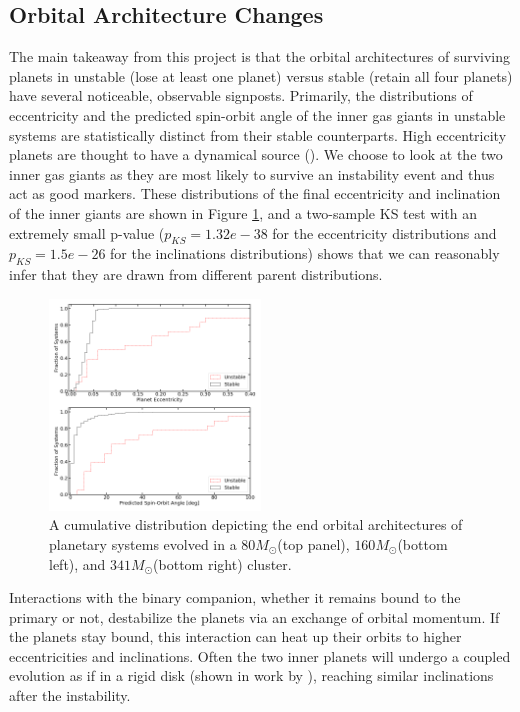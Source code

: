 \documentclass[manuscript]{aastex631}
\begin{document}
\subsection{Orbital Architecture Changes}
The main takeaway from this project is that the orbital architectures of surviving planets in unstable (lose at least one planet)
 versus stable (retain all four planets) have several noticeable, observable signposts. 
 Primarily, the distributions of eccentricity and the predicted spin-orbit angle of the inner gas giants in 
 unstable systems are statistically distinct from their stable counterparts. High eccentricity planets are thought to have a dynamical source (\cite{dlfm97}).
  We choose to look at the 
 two inner gas giants as they are most likely to survive an instability event and thus act as good markers.
These distributions of the final eccentricity and inclination of the inner giants are shown in Figure \ref{fig:160_ecc_inc}, 
 and a two-sample KS test with an extremely small p-value ($p_{KS} = 1.32e-38$ for the eccentricity distributions
 and $p_{KS} = 1.5e-26$ for the inclinations distributions) shows that we can reasonably infer that they are drawn from different parent distributions. 
\begin{figure}[h!]
    \centering
    \includegraphics[width=0.5\textwidth]{fig/cumulative_ecc_inc_bigfont80.png}
    
    \caption{A cumulative distribution depicting the end orbital architectures of planetary systems evolved in a $80M_{\odot}$(top panel), $160M_{\odot}$(bottom left), 
    and $341M_{\odot}$(bottom right) cluster.}
    \label{fig:160_ecc_inc}
\end{figure}
Interactions with the binary companion, whether it remains bound to the primary or not, destabilize the planets via an exchange of orbital 
momentum. If the planets stay bound, this interaction can heat up their orbits to higher eccentricities and inclinations. Often the two
inner planets will undergo a coupled evolution as if in a rigid disk (shown in work by \cite{ina97}), reaching similar inclinations after the instability. 
\end{document}
